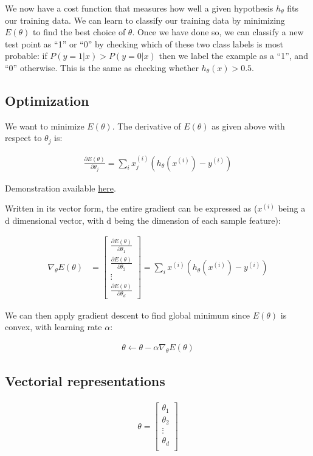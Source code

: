 We now have a cost function that measures how well a given hypothesis $h_\theta$ fits our training data. We can learn to classify our training data by minimizing $E(\theta)$ to find the best choice of $\theta$. Once we have done so, we can classify a new test point as “1” or “0” by checking which of these two class labels is most probable: if $P(y=1|x) > P(y=0|x)$ then we label the example as a “1”, and “0” otherwise. This is the same as checking whether $h_\theta(x) > 0.5$.

\subsection{Optimization}
We want to minimize $E(\theta)$. The derivative of $E(\theta)$ as given above with respect to $\theta_j$ is:

\begin{align}
	\frac{\partial E(\theta)}{\partial \theta_j} = \sum_i x^{(i)}_j (h_\theta(x^{(i)}) - y^{(i)})
\end{align}

Demonstration available \href{https://math.stackexchange.com/questions/477207/derivative-of-cost-function-for-logistic-regression}{here}.

Written in its vector form, the entire gradient can be expressed as ($x^{(i)}$ being a d dimensional vector, with d being the dimension of each sample feature):

\begin{align}
	\nabla_\theta E(\theta) 
	&= 
	\begin{bmatrix}
		\frac{\partial E(\theta)}{\partial \theta_1}\\
		\frac{\partial E(\theta)}{\partial \theta_2}\\
		\vdots\\
		\frac{\partial E(\theta)}{\partial \theta_d}
	\end{bmatrix}
	=
		\sum_i x^{(i)} (h_\theta(x^{(i)}) - y^{(i)})
\end{align}

We can then apply gradient descent to find global minimum since $E(\theta)$ is convex, with learning rate $\alpha$:

\begin{align}
	\theta \leftarrow \theta - \alpha \nabla_\theta E(\theta)
\end{align}

\subsection{Vectorial representations}
\begin{align}
	\theta = \left[
	\begin{array}{cccc}
		\theta_{1} \\
		\theta_{2} \\
		\vdots\\
		\theta_{d} \\
	\end{array}\right]
\end{align}

